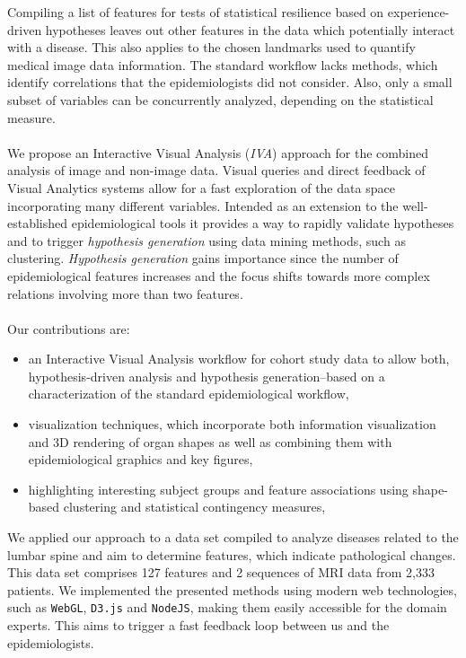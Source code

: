 \documentclass[journal]{style/vgtc} 			          %
\begin{document}
Compiling a list of features for tests of statistical resilience based on experience-driven hypotheses leaves out other features in the data which potentially interact with a disease.
%
This also applies to the chosen landmarks used to quantify medical image data information.
%
The standard workflow lacks methods, which identify correlations that the epidemiologists did not consider.
%
Also, only a small subset of variables can be concurrently analyzed, depending on the statistical measure.
\\\\
We propose an Interactive Visual Analysis (\emph{IVA}) approach \cite{Thomas2005} for the combined analysis of image and non-image data.
%
Visual queries and direct feedback of Visual Analytics systems allow for a fast exploration of the data space incorporating many different variables.
%
Intended as an extension to the well-established epidemiological tools it provides a way to rapidly validate hypotheses and to trigger \emph{hypothesis generation} using data mining methods, such as clustering.
%
\emph{Hypothesis generation} gains importance since the number of epidemiological features increases and the focus shifts towards more complex relations involving more than two features.
\\\\
Our contributions are:
\begin{itemize}
	\item an Interactive Visual Analysis workflow for cohort study data to allow both, hypothesis-driven analysis and hypothesis generation--based on a characterization of the standard epidemiological workflow,
	\item visualization techniques, which incorporate both information visualization and 3D rendering of organ shapes as well as combining them with epidemiological graphics and key figures,
	\item highlighting interesting subject groups and feature associations using shape-based clustering and statistical contingency measures,
\end{itemize}
We applied our approach to a data set compiled to analyze diseases related to the lumbar spine and aim to determine features, which indicate pathological changes.
%
This data set comprises 127 features and 2 sequences of MRI data from 2,333 patients.
%
We implemented the presented methods using modern web technologies, such as \texttt{WebGL}, \texttt{D3.js} and \texttt{NodeJS}, making them easily accessible for the domain experts.
%
This aims to trigger a fast feedback loop between us and the epidemiologists.
\end{document}
